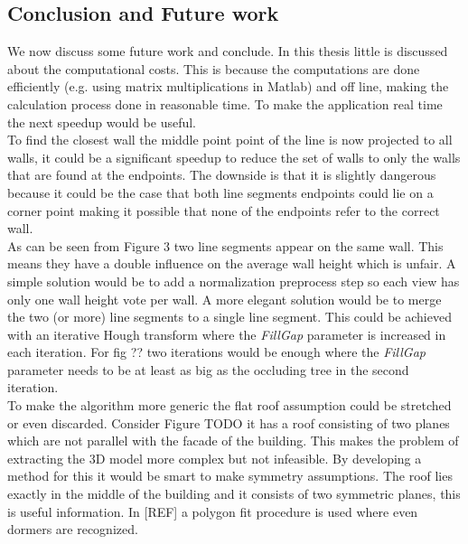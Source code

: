 \documentclass[10pt]{article}
\begin{document}



\subsection{Conclusion and Future work}
We now discuss some future work and conclude.  In this thesis little is discussed about the computational costs. This is because the computations are done efficiently (e.g. using matrix multiplications in Matlab) and off line, making the calculation process done in reasonable time. To make the application real time the next speedup would be useful.\\
To find the closest wall the middle point point of the line is now projected to all walls, it could be a significant speedup to reduce the set of walls to only the walls that are found at the endpoints. The downside is that it is slightly dangerous because it could be the case that both line segments endpoints could lie on a corner point making it possible that none of the endpoints refer to the correct wall.\\

As can be seen from Figure 3
two line segments appear on the same wall. This means they have a double influence on the average wall height which is unfair. A simple solution would be to add a normalization preprocess step so each view has only one wall height vote per wall. A more elegant solution would be to merge the two (or more) line segments to a single line segment. This could be achieved with an iterative Hough transform where the \emph{FillGap} parameter is increased in each iteration. For fig ?? %
two iterations would be enough where the \emph{FillGap} parameter needs to be at least as big as the occluding tree in the second iteration.\\
To make the algorithm more generic the flat roof assumption could be stretched or even discarded.
Consider Figure TODO %
it has a roof consisting of two planes which are not parallel with the facade of the building. This makes the problem of extracting the 3D model more complex but not 
infeasible. By developing a method for this it would be smart to make symmetry assumptions. The roof lies exactly in the middle of the building and it consists of two symmetric planes, this is useful information. In 
[REF] a polygon fit procedure is used where even dormers are recognized.\\
\end{document}
